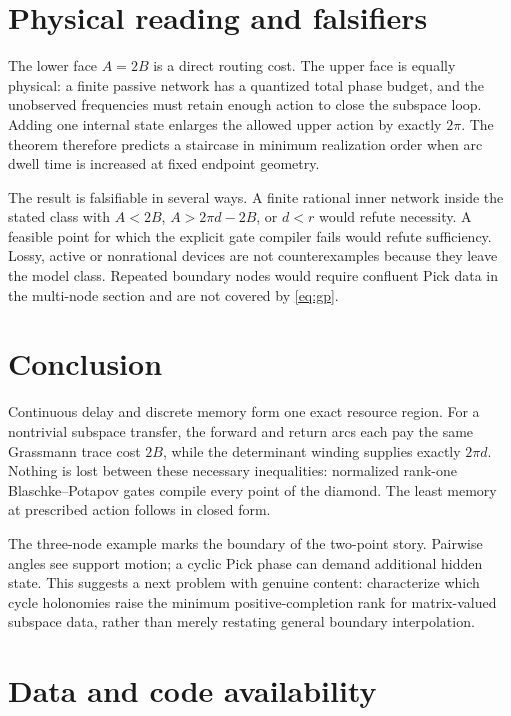 \documentclass[11pt]{article}
\theoremstyle{definition}
\theoremstyle{remark}
\begin{document}
\section{Physical reading and falsifiers}

The lower face $A=2B$ is a direct routing cost.  The upper face is equally
physical: a finite passive network has a quantized total phase budget, and
the unobserved frequencies must retain enough action to close the subspace
loop.  Adding one internal state enlarges the allowed upper action by exactly
$2\pi$.  The theorem therefore predicts a staircase in minimum realization
order when arc dwell time is increased at fixed endpoint geometry.

The result is falsifiable in several ways.  A finite rational inner network
inside the stated class with $A<2B$, $A>2\pi d-2B$, or $d<r$ would refute
necessity.  A feasible point for which the explicit gate compiler fails
would refute sufficiency.  Lossy, active or nonrational devices are not
counterexamples because they leave the model class.  Repeated boundary nodes
would require confluent Pick data in the multi-node section and are not
covered by \eqref{eq:gp}.

\section{Conclusion}

Continuous delay and discrete memory form one exact resource region.  For a
nontrivial subspace transfer, the forward and return arcs each pay the same
Grassmann trace cost $2B$, while the determinant winding supplies exactly
$2\pi d$.  Nothing is lost between these necessary inequalities: normalized
rank-one Blaschke--Potapov gates compile every point of the diamond.  The
least memory at prescribed action follows in closed form.

The three-node example marks the boundary of the two-point story.  Pairwise
angles see support motion; a cyclic Pick phase can demand additional hidden
state.  This suggests a next problem with genuine content: characterize
which cycle holonomies raise the minimum positive-completion rank for
matrix-valued subspace data, rather than merely restating general boundary
interpolation.

\section*{Data and code availability}
\end{document}
